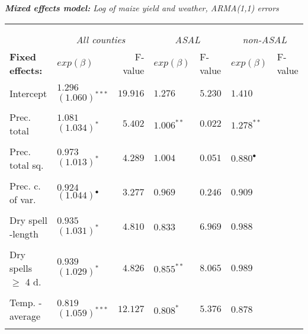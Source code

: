 \documentclass[a4paper,12pt]{article}
\begin{document}
{\hspace{-1.5cm}
\begin{threeparttable}
\singlespacing
\caption{\textit{\textbf{Mixed  effects model:} Log of maize yield and weather, ARMA(1,1) errors}}
\label{KenARe11} 
\begin{footnotesize}

\begin{tabular}{llrllll} 

\hline \vspace{-0.2cm} \\
\vspace{-0.2cm} \\
  \multicolumn{1}{l}{\vspace{0.1cm}\textbf{ }}  &\multicolumn{2}{c}{\textit{All counties}} &\multicolumn{2}{c}{\textit{ASAL}} &\multicolumn{2}{c}{\textit{non-ASAL}}\\
    \multicolumn{1}{l}{\vspace{0.1cm}\textbf{Fixed effects:}}&$exp(\beta)$&F-value%
    &$exp(\beta)$&F-value&$exp(\beta)$&F-value\\
 \hline 
\hline
\\
\vspace{-0.2cm}Intercept&$1.296$ $(1.060)^{***}$&$19.916$&$1.276$&$5.230$&$1.410^{}$&\\
  \\
\vspace{-0.2cm}Prec. total&$1.081$ $(1.034)^{*}$&$5.402$&$1.006^{**}$&$0.022$&$1.278^{**}$&\\
  \\
  \vspace{-0.2cm}Prec. total sq.&$0.973$ $(1.013)^{*}$&$4.289$&$1.004$&$0.051$&$0.880^{\bullet}$&\\
    \\
      \vspace{-0.2cm}Prec. c. of var.&$0.924$ $(1.044)^{\bullet}$&$3.277$&$0.969$ &$0.246$&$0.909^{}$\\
  \\

         \vspace{-0.2cm}Dry spell -length&$0.935$ $(1.031)^{*}$&$4.810$&$0.833$ ${}$&$6.969$&$ 0.988^{}$&\\
  \\
        \vspace{-0.2cm}Dry spells 	$\geq$ 4 d.&$0.939$ $(1.029)^{*}$&$4.826$&$0.855^{**}$&$8.065$&$0.989^{}$&\\
  \\
          \vspace{-0.2cm}Temp. - average&$0.819$ $(1.059)^{***}$&$12.127$&$0.808^{*}$&$5.376$&$0.878$ $^{}$&\\
  \\
  

\end{tabular}
\end{footnotesize}
\end{threeparttable}}
\end{document}
